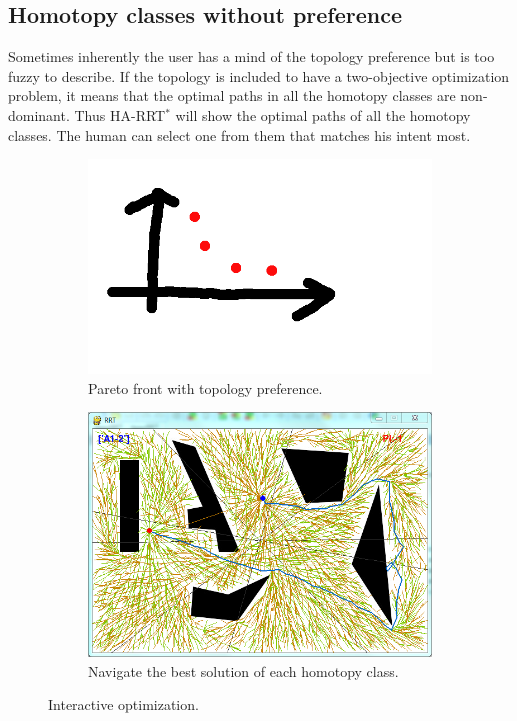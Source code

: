 \documentclass[letterpaper, 10 pt, conference]{ieeeconf}
\begin{document}
\subsection{Homotopy classes without preference}

Sometimes inherently the user has a mind of the topology preference but is too fuzzy to describe.
If the topology is included to have a two-objective optimization problem, it means that the optimal paths in all the homotopy classes are non-dominant.
Thus HA-RRT$^{*}$ will show the optimal paths of all the homotopy classes.
The human can select one from them that matches his intent most.

\begin{figure}
	\centering
	\begin{subfigure}[t]{0.47\linewidth}
		\centering
		\includegraphics[width=\textwidth]{fig/pareto.png}
		\caption{Pareto front with topology preference.}
		\label{fig:homotopy_human_interaction:pareto}
	\end{subfigure}  
	\begin{subfigure}[t]{0.47\linewidth}
		\centering
		\includegraphics[width=\textwidth]{fig/navBestInHomotopy.png}
		\caption{Navigate the best solution of each homotopy class.}
		\label{fig:homotopy_human_interaction:all}
	\end{subfigure}   
	\caption{Interactive optimization.}
	\label{fig:homotopy_human_interaction}
\end{figure}
\end{document}

